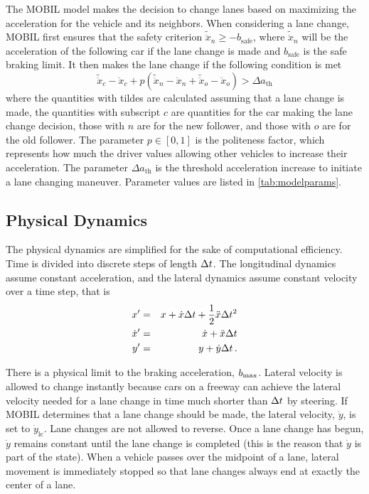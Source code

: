 The MOBIL model makes the decision to change lanes based on maximizing the acceleration for the vehicle and its neighbors.
When considering a lane change, MOBIL first ensures that the safety criterion $\tilde{\ddot{x}}_n \geq -b_\text{safe}$, where $\tilde{\ddot{x}}_n$ will be the acceleration of the following car if the lane change is made and $b_\text{safe}$ is the safe braking limit. 
It then makes the lane change if the following condition is met
\begin{equation}
    \tilde{\ddot{x}}_c - \ddot{x}_c + p \left( \tilde{\ddot{x}}_n - \ddot{x}_n + \tilde{\ddot{x}}_o - \ddot{x}_o \right) > \Delta a_\text{th}
\end{equation}
where the quantities with tildes are calculated assuming that a lane change is made, the quantities with subscript $c$ are quantities for the car making the lane change decision, those with $n$ are for the new follower, and those with $o$ are for the old follower.
The parameter $p \in [0,1]$ is the politeness factor, which represents how much the driver values allowing other vehicles to increase their acceleration. The parameter $\Delta a_\text{th}$ is the threshold acceleration increase to initiate a lane changing maneuver. Parameter values are listed in \cref{tab:modelparams}.


\subsection{Physical Dynamics} \label{sec:dynamics}

The physical dynamics are simplified for the sake of computational efficiency. Time is divided into discrete steps of length $\Delta t$.
The longitudinal dynamics assume constant acceleration, and the lateral dynamics assume constant velocity over a time step, that is
\begin{eqnarray*}
    x'&=&x + \dot{x} \Delta t + \frac{1}{2} \ddot{x} \Delta t^2 \\
    \dot{x}'&=&\dot{x} + \ddot{x} \Delta t \\
    y'&=&y + \dot{y} \Delta t \, \text{.}
\end{eqnarray*}

There is a physical limit to the braking acceleration, $b_\text{max}$.
Lateral velocity is allowed to change instantly because cars on a freeway can achieve the lateral velocity needed for a lane change in time much shorter than $\Delta t$ by steering.
If MOBIL determines that a lane change should be made, the lateral velocity, $\dot{y}$, is set to $\dot{y}_\text{lc}$.
Lane changes are not allowed to reverse. Once a lane change has begun, $\dot{y}$ remains constant until the lane change is completed (this is the reason that $\dot{y}$ is part of the state).
When a vehicle passes over the midpoint of a lane, lateral movement is immediately stopped so that lane changes always end at exactly the center of a lane.


